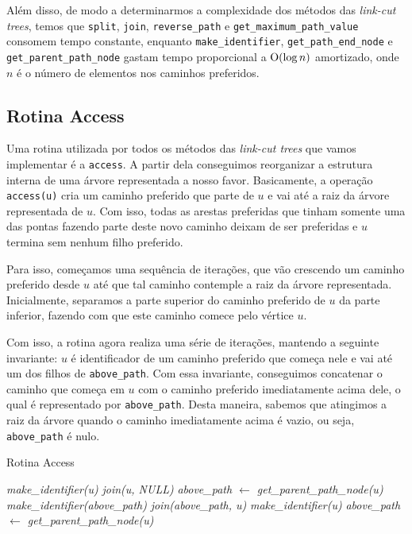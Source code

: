 Além disso, de modo a determinarmos a complexidade dos métodos das \emph{link-cut trees}, temos que \texttt{split}, \texttt{join}, \texttt{reverse\_path} e \texttt{get\_maximum\_path\_value} consomem tempo constante, enquanto \texttt{make\_identifier}, \texttt{get\_path\_end\_node} e \texttt{get\_parent\_path\_node} gastam tempo proporcional a $\mathrm{O}(\log n)$ amortizado, onde $n$ é o número de elementos nos caminhos preferidos.

\subsection{Rotina Access}
\label{subsection:lct-access}

Uma rotina utilizada por todos os métodos das \emph{link-cut trees} que vamos implementar é a \texttt{access}. A partir dela conseguimos reorganizar a estrutura interna de uma árvore representada a nosso favor. Basicamente, a operação \texttt{access(u)} cria um caminho preferido que parte de $u$ e vai até a raiz da árvore representada de $u$. Com isso, todas as arestas preferidas que tinham somente uma das pontas fazendo parte deste novo caminho deixam de ser preferidas e $u$ termina sem nenhum filho preferido.

Para isso, começamos uma sequência de iterações, que vão crescendo um caminho preferido desde $u$ até que tal caminho contemple a raiz da árvore representada. Inicialmente, separamos a parte superior do caminho preferido de $u$ da parte inferior, fazendo com que este caminho comece pelo vértice $u$.

Com isso, a rotina agora realiza uma série de iterações, mantendo a seguinte invariante: $u$ é identificador de um caminho preferido que começa nele e vai até um dos filhos de \texttt{above\_path}. Com essa invariante, conseguimos concatenar o caminho que começa em $u$ com o caminho preferido imediatamente acima dele, o qual é representado por \texttt{above\_path}. Desta maneira, sabemos que atingimos a raiz da árvore quando o caminho imediatamente acima é vazio, ou seja, \texttt{above\_path} é nulo.

\begin{algorithm}[h!]
    \caption{Rotina Access}\label{lct:access}
    \begin{algorithmic}
        \State \emph{make\_identifier(u)}
        \State \emph{join(u, NULL)}
        \State \emph{above\_path $\gets$ get\_parent\_path\_node(u)}
        \State {}
        \State \emph{make\_identifier(above\_path)}
        \State {}
        \State \emph{join(above\_path, u)}
        \State \emph{make\_identifier(u)}
        \State \emph{above\_path $\gets$ get\_parent\_path\_node(u)}
        \EndWhile
        \EndFunction
    \end{algorithmic}
\end{algorithm}

